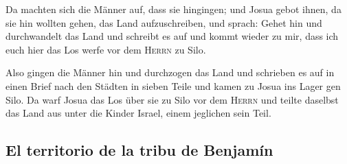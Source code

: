  Da machten sich die Männer auf, dass sie hingingen; und
Josua gebot ihnen, da sie hin wollten gehen, das Land aufzuschreiben,
und sprach: Gehet hin und durchwandelt das Land und schreibt es auf und
kommt wieder zu mir, dass ich euch hier das Los werfe vor dem
\textsc{Herrn} zu Silo.

 Also gingen die Männer hin und durchzogen das Land und
schrieben es auf in einen Brief nach den Städten in sieben Teile und
kamen zu Josua ins Lager gen Silo.  Da warf Josua das Los
über sie zu Silo vor dem \textsc{Herrn} und teilte daselbst das Land aus
unter die Kinder Israel, einem jeglichen sein Teil.

\hypertarget{el-territorio-de-la-tribu-de-benjamuxedn}{%
\subsection{El territorio de la tribu de
Benjamín}\label{el-territorio-de-la-tribu-de-benjamuxedn}}

